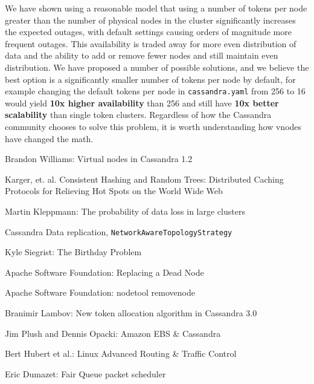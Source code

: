 \documentclass{article}
\begin{document}
We have shown using a reasonable model that using a number of tokens per node
greater than the number of physical nodes in the cluster significantly increases
the expected outages, with default settings causing orders of magnitude more
frequent outages. This availability is traded away for more even distribution
of data and the ability to add or remove fewer nodes and still maintain even
distribution. We have proposed a number of possible solutions, and we
believe the best option is a significantly smaller number of tokens per node
by default, for example changing the default tokens per node in
\texttt{cassandra.yaml} from 256 to 16 would yield \textbf{10x higher availability}
than 256 and still have \textbf{10x better scalability} than single token clusters.
Regardless of how the Cassandra community chooses to solve this problem, it is
worth understanding how vnodes have changed the math.

\begin{thebibliography}{9}

Brandon Williams: Virtual nodes in Cassandra 1.2

Karger, et. al. Consistent Hashing and Random Trees: Distributed Caching Protocols for Relieving Hot Spots on the World Wide Web

Martin Kleppmann: The probability of data loss in large clusters

Cassandra Data replication, \texttt{NetworkAwareTopologyStrategy}

Kyle Siegrist: The Birthday Problem

Apache Software Foundation: Replacing a Dead Node

Apache Software Foundation: nodetool removenode

Branimir Lambov: New token allocation algorithm in Cassandra 3.0

Jim Plush and Dennis Opacki: Amazon EBS \& Cassandra

Bert Hubert et al.: Linux Advanced Routing \& Traffic Control

Eric Dumazet: Fair Queue packet scheduler

\end{thebibliography}
\end{document}
